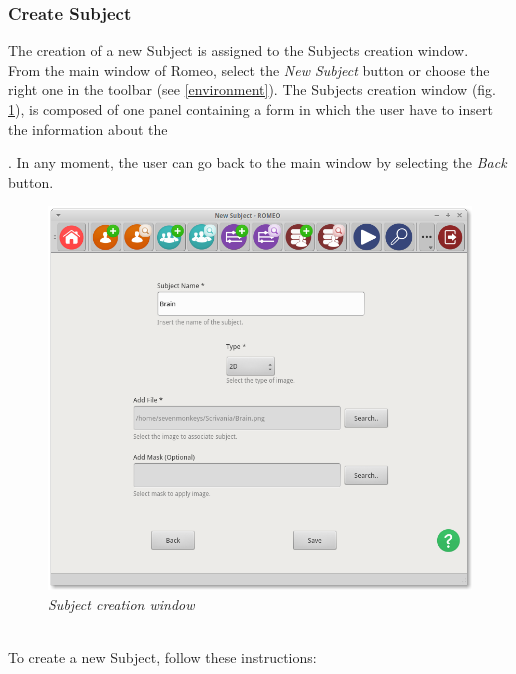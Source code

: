 \subsubsection{Create Subject}
\label{createsubject}
The creation of a new Subject\g{} is assigned to the Subjects\g{} creation window.\\
From the main window of Romeo, select the \textit{New Subject} button or choose the right one in the toolbar (see \ref{environment}). The Subjects\g{} creation window (fig. \ref{createsubjectimg}), is composed of one panel containing a form in which the user have to insert the information about the \subject{}. In any moment, the user can go back to the main window by selecting the \textit{Back} button.
\begin{figure}[!h]
\begin{center}
\includegraphics[scale=0.4]{./Images/NewSubjectView}
\caption{\textit{Subject creation window}}
\label{createsubjectimg}
\end{center}
\end{figure}
\\To create a new Subject\g{}, follow these instructions:
